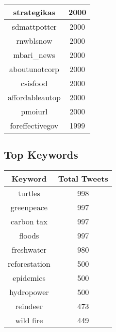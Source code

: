 \documentclass{article}\usepackage[T1]{fontenc}
\begin{document}
\begin{tabular}{|c|c|}
 \hline
strategikas & 2000\\ 
 \hline
sdmattpotter & 2000\\ 
 \hline
rnwblsnow & 2000\\ 
 \hline
mbari\_news & 2000\\ 
 \hline
aboutunotcorp & 2000\\ 
 \hline
csisfood & 2000\\ 
 \hline
affordableautop & 2000\\ 
 \hline
pmoiurl & 2000\\ 
 \hline
foreffectivegov & 1999\\ 
 \hline
\end{tabular}\subsection*{Top Keywords}\begin{tabular}{|c|c|}         \hline         Keyword & Total Tweets \\ 
 \hline
turtles & 998\\ 
 \hline
greenpeace & 997\\ 
 \hline
carbon tax & 997\\ 
 \hline
floods & 997\\ 
 \hline
freshwater & 980\\ 
 \hline
reforestation & 500\\ 
 \hline
epidemics & 500\\ 
 \hline
hydropower & 500\\ 
 \hline
reindeer & 473\\ 
 \hline
wild fire & 449\\ 
 \hline
\end{tabular}
\end{document}

